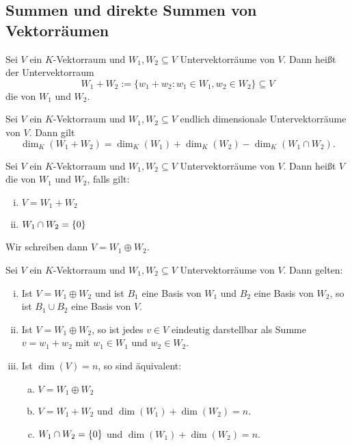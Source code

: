 \subsection{Summen und direkte Summen von Vektorräumen}

\begin{definition}
	\label{def:I.12.1}
	Sei $V$ ein $K$-Vektorraum und $W_1,W_2 \subseteq V$ Untervektorräume von $V$.
	Dann heißt der Untervektorraum
	\[
		W_1 + W_2 := \{w_1 + w_2 : w_1 \in W_1, w_2 \in W_2\} \subseteq V
	\]
	die  von $W_1$ und $W_2$.
\end{definition}

\begin{satz}
	\label{satz:I.12.2}
	Sei $V$ ein $K$-Vektorraum und $W_1,W_2 \subseteq V$ endlich dimensionale Untervektorräume von $V$.
	Dann gilt
	\[
		\dim_K(W_1+W_2) = \dim_K(W_1) + \dim_K(W_2) - \dim_K(W_1 \cap W_2).
	\]
\end{satz}

\begin{definition}
	\label{def:I.12.3}
	Sei $V$ ein $K$-Vektorraum und $W_1,W_2 \subseteq V$ Untervektorräume von $V$.
	Dann heißt $V$ die  von $W_1$ und $W_2$, falls gilt:
	\begin{enumerate}[(i)]
		\item	$V = W_1 + W_2$
		\item	$W_1 \cap W_2 = \{0\}$
	\end{enumerate}
	Wir schreiben dann $V = W_1 \oplus W_2$.
\end{definition}

\begin{satz}
	\label{satz:I.12.4}
	Sei $V$ ein $K$-Vektorraum und $W_1,W_2 \subseteq V$ Untervektorräume von $V$.
	Dann gelten:
	\begin{enumerate}[(i)]
		\item Ist $V = W_1 \oplus W_2$ und ist $B_1$ eine Basis von $W_1$ und $B_2$ eine Basis von  $W_2$, so ist $B_1 \cup B_2$ eine Basis von $V$.
		\item Ist $V = W_1 \oplus W_2$, so ist jedes $v \in V$ eindeutig darstellbar als Summe $v = w_1 + w_2$ mit $w_1 \in W_1$ und $w_2 \in W_2$.
		\item Ist $\dim(V) = n$, so sind äquivalent:
		\begin{enumerate}[a)]
			\item $V = W_1 \oplus W_2$
			\item $V = W_1 + W_2$ und $\dim(W_1) + \dim(W_2) = n$.
			\item $W_1 \cap W_2 = \{0\}$ und $\dim(W_1) + \dim(W_2) = n$.
		\end{enumerate}
	\end{enumerate}
\end{satz}

